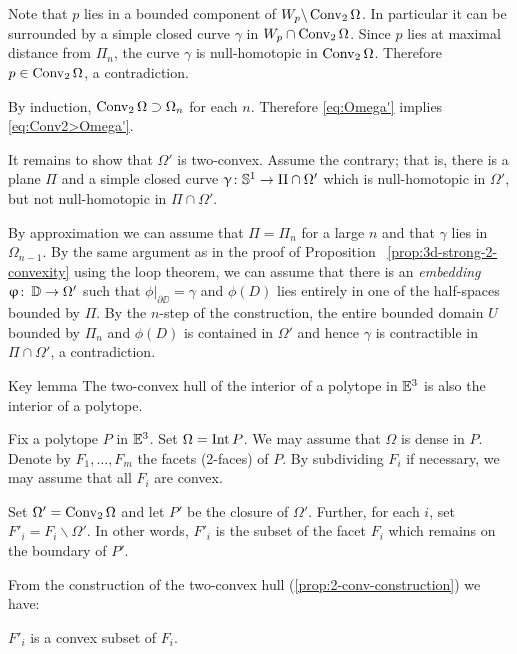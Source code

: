 Note that $p$ lies in a bounded component of $W_p\backslash \mathop{\rm Conv}\nolimits_2\Omega$.
In particular it can be surrounded by a simple closed curve $\gamma$ in $W_p\cap\Conv_2\Omega$.
Since $p$ lies at maximal distance from $\Pi_n$,
the curve $\gamma$ is null-homotopic in $\mathop{\rm Conv}\nolimits_2\Omega$.
Therefore $p\in \Conv_2\Omega$, a contradiction.

By induction, $\Conv_2\Omega\supset\Omega_n$ for each $n$.
Therefore \ref{eq:Omega'} implies \ref{eq:Conv2>Omega'}.

It remains to show that $\Omega'$ is two-convex.
Assume the contrary; 
that is, there is a plane $\Pi$ 
and a simple closed curve $\gamma\:\SS^1\to \Pi\cap \Omega'$ 
which is null-homotopic in $\Omega'$,
but not null-homotopic in $\Pi\cap\Omega'$.

By approximation we can assume that $\Pi=\Pi_n$ for a large $n$ and that $\gamma$ lies in $\Omega_{n-1}$.
By the same argument as in the proof of Proposition ~\ref{prop:3d-strong-2-convexity} using the loop theorem, we can assume that there is an \emph{embedding} $\phi\co \DD\to \Omega'$ such that $\phi|_{\partial\DD}=\gamma$ and $\phi(D)$ lies entirely in one of the half-spaces bounded by $\Pi$.  By the $n$-step of the construction, the entire bounded domain $U$ bounded by $ \Pi_n$ and $\phi(D)$ is contained in $\Omega'$ and hence $\gamma$ is contractible in $\Pi\cap\Omega'$, a contradiction. \qeds

\begin{thm}{Key lemma}\label{lem:key-shefel}
The two-convex hull of the interior of a polytope in $\mathbb{E}^3$
is also the interior of a polytope.
\end{thm}

Fix a polytope $P$ in $\mathbb{E}^3$.
Set $\Omega=\mathop{\rm Int}\nolimits P$.  We may assume that  $\Omega$ is dense in $P$.
Denote by $F_1,\dots,F_m$ the facets 
(2-faces)
of $P$. By subdividing $F_i$ if necessary, we may assume that all $F_i$ are convex.

Set $\Omega'=\mathop{\rm Conv}\nolimits_2\Omega$ and let $P'$ be the closure of $\Omega'$.
Further, 
for each $i$, 
set $F'_i=F_i\backslash \Omega'$.
In other words, 
$F'_i$ is the subset of the facet $F_i$ 
which remains on the boundary of $P'$.

From the construction of the two-convex hull (\ref{prop:2-conv-construction}) we have:

\begin{clm}{}\label{clm:F'-convex}
$F'_i$ is  a convex subset of $F_i$.
\end{clm}

